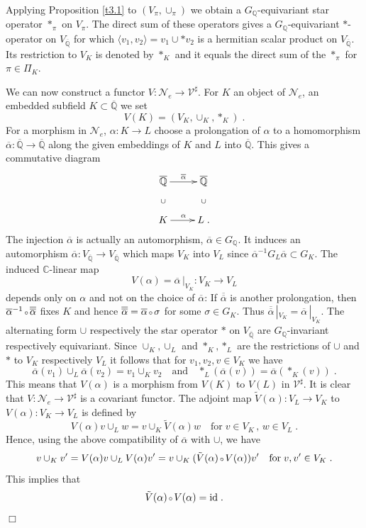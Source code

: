 \documentclass[12pt,leqno]{article}
\newcommand{\C}{{\mathbb{C}}}
\newcommand{\Q}{{\mathbb{Q}}}
\newcommand{\oQ}{\overline{\Q}}
\newcommand{\id}{\mathrm{id}}
\newcommand{\Nh}{{\mathcal N}}
\newcommand{\Vh}{\mathcal{V}}
\newcommand{\oalpha}{\overline{\alpha}}
\newcommand{\ooalpha}{\overline{\oalpha}}
\newcommand{\tV}{\tilde{V}}
\newenvironment{proofof}{\noindent {\bf Proof of}}{\mbox{}\hspace*{\fill}$\Box$}
\newcommand{\verk}{\mbox{\scriptsize $\,\circ\,$}}
\begin{document}
\begin{proofof}
Applying Proposition \ref{t3.1} to $(V_{\pi} , \cup_{\pi})$ we obtain a $G_{\Q}$-equivariant star operator $*_{\pi}$ on $V_{\pi}$. The direct sum of these operators gives a $G_{\Q}$-equivariant $*$-operator on $V_{\oQ}$ for which $\langle v_1 , v_2 \rangle = v_1 \cup *v_2$ is a hermitian scalar product on $V_{\oQ}$. Its restriction to $V_K$ is denoted by $*_K$ and it equals the direct sum of the $*_{\pi}$ for $\pi \in \Pi_K$. 

We can now construct a functor $V: \Nh_e \to \Vh^{\sharp}$. For $K$ an object of $\Nh_e$, an embedded subfield $K \subset \oQ$ we set
\[
V (K) = (V_K , \cup_K , *_K) \; .
\]
For a morphism in $\Nh_e$, $\alpha : K \to L$ choose a prolongation of $\alpha$ to a homomorphism $\oalpha : \oQ \to \oQ$ along the given embeddings of $K$ and $L$ into $\oQ$. This gives a commutative diagram
\[
\xymatrix{
\oQ \ar[r]^{\oalpha} \ar@{}[d]|{\cup} & \oQ \ar@{}[d]|{\cup}\\
K \ar[r]^{\alpha} & L \; .
}
\]
The injection $\oalpha$ is actually an automorphism, $\oalpha \in G_{\Q}$. It induces an automorphism $\oalpha : V_{\oQ} \to V_{\oQ}$ which maps $V_K$ into $V_L$ since $\oalpha^{-1} G_L \oalpha \subset G_K$. The induced $\C$-linear map
\[
V (\alpha) = \oalpha \, |_{V_K} : V_K \longrightarrow V_L
\]
depends only on $\alpha$ and not on the choice of $\oalpha$: If $\ooalpha$ is another prolongation, then $\oalpha^{-1} \verk \ooalpha$ fixes $K$ and hence $\ooalpha = \oalpha \verk \sigma$ for some $\sigma \in G_K$. Thus $\ooalpha \, |_{V_K} = \oalpha \, |_{V_K}$. The alternating form $\cup$ respectively the star operator $*$ on $V_{\oQ}$ are $G_{\Q}$-invariant respectively equivariant. Since $\cup_K , \cup_L$ and $*_K , *_L$ are the restrictions of $\cup$ and $*$ to $V_K$ respectively $V_L$ it follows that for $v_1 , v_2 , v \in V_K$ we have
\[
\oalpha (v_1) \cup_L \oalpha (v_2) = v_1 \cup_K v_2 \quad \text{and} \quad *_L (\oalpha (v)) = \oalpha (*_K (v)) \; .
\]
This means that $V (\alpha)$ is a morphism from $V (K)$ to $V (L)$ in $\Vh^{\sharp}$. It is clear that $V : \Nh_e \to \Vh^{\sharp}$ is a covariant functor. The adjoint map $\tV (\alpha) : V_L \to V_K$ to $V (\alpha) : V_K \to V_L$ is defined by 
\[
V (\alpha) v \cup_L w = v \cup_K \tV (\alpha) w \quad \text{for} \; v \in V_K \, , \, w \in V_L \; . 
\]
Hence, using the above compatibility of $\oalpha$ with $\cup$, we have
\[
v \cup_K v' = V (\alpha) v \cup_L V (\alpha) v' = v \cup_K (\tV (\alpha) \verk V (\alpha)) v' \quad \text{for} \; v , v' \in V_K \; .
\]
This implies that
\[
\tV (\alpha) \verk V (\alpha) = \id \; .
\]
\end{proofof}
\end{document}
